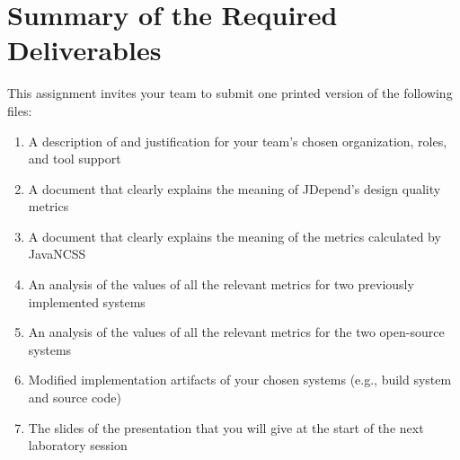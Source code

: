 \section*{Summary of the Required Deliverables}

This assignment invites your team to submit one printed version of the following files:
\vspace*{-.1in}
\begin{enumerate}
    \itemsep0em
    \item A description of and justification for your team's chosen organization, roles, and tool support
    \item A document that clearly explains the meaning of JDepend's design quality metrics
    \item A document that clearly explains the meaning of the metrics calculated by JavaNCSS
    \item An analysis of the values of all the relevant metrics for two previously implemented systems
    \item An analysis of the values of all the relevant metrics for the two open-source systems
    \item Modified implementation artifacts of your chosen systems (e.g., build system and source code)
    \item The slides of the presentation that you will give at the start of the next laboratory session
\end{enumerate}
\vspace*{-.1in}

\printbibliography[filter=papers,title={Publications}]


